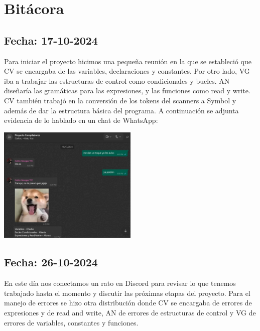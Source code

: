 \documentclass[a4paper,12pt]{article}
\begin{document}
\section*{Bitácora}

\subsection*{Fecha: 17-10-2024}
\begin{flushleft}
    \hspace*{2em} Para iniciar el proyecto hicimos una pequeña
    reunión en la que se estableció que CV se encargaba de las
    variables, declaraciones y constantes. Por otro lado, VG
	iba a trabajar las estructuras de control como condicionales
	y bucles. AN diseñaría las gramáticas para las expresiones, 
	y las funciones como read y write. CV también trabajó en la 
	conversión de los tokens del scanners a Symbol y además de dar 
	la estructura básica del programa. A continuación se adjunta 
	evidencia de lo hablado en un chat de WhatsApp:\par\vspace{1em}
	\centering
	\includegraphics[width=0.5\textwidth]{log_1.jpg}\par
\end{flushleft}

\subsection*{Fecha: 26-10-2024}
\begin{flushleft}
    En este día nos conectamos un rato en Discord para revisar 
	lo que tenemos trabajado hasta el momento y discutir las 
	próximas etapas del proyecto. Para el manejo de errores se hizo 
	otra distribución donde CV se encargaba de errores de expresiones 
	y de read and write, AN de errores de estructuras de control y VG 
	de errores de variables, constantes y funciones.
\end{flushleft}
\end{document}
